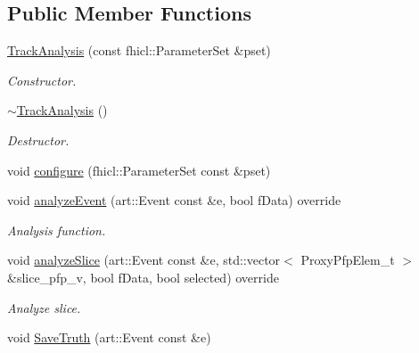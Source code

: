 \subsection*{Public Member Functions}
\begin{DoxyCompactItemize}
\item 
\hyperlink{classanalysis_1_1TrackAnalysis_aed13157ba9297149fe4e15676e6db7fc}{Track\+Analysis} (const fhicl\+::\+Parameter\+Set \&pset)
\begin{DoxyCompactList}\small\item\em Constructor. \end{DoxyCompactList}\item 
\hyperlink{classanalysis_1_1TrackAnalysis_a6f96bc87ab6d9dffb6417d7d2f1a89e2}{$\sim$\+Track\+Analysis} ()\hypertarget{classanalysis_1_1TrackAnalysis_a6f96bc87ab6d9dffb6417d7d2f1a89e2}{}\label{classanalysis_1_1TrackAnalysis_a6f96bc87ab6d9dffb6417d7d2f1a89e2}

\begin{DoxyCompactList}\small\item\em Destructor. \end{DoxyCompactList}\item 
void \hyperlink{classanalysis_1_1TrackAnalysis_a427d588370a8044b77560c92d3a35ea6}{configure} (fhicl\+::\+Parameter\+Set const \&pset)
\item 
void \hyperlink{classanalysis_1_1TrackAnalysis_aa5a295fc3fe8aa050905361f469ff108}{analyze\+Event} (art\+::\+Event const \&e, bool f\+Data) override
\begin{DoxyCompactList}\small\item\em Analysis function. \end{DoxyCompactList}\item 
void \hyperlink{classanalysis_1_1TrackAnalysis_a00e51059eed5a6486c9eb2f2f16017de}{analyze\+Slice} (art\+::\+Event const \&e, std\+::vector$<$ Proxy\+Pfp\+Elem\+\_\+t $>$ \&slice\+\_\+pfp\+\_\+v, bool f\+Data, bool selected) override\hypertarget{classanalysis_1_1TrackAnalysis_a00e51059eed5a6486c9eb2f2f16017de}{}\label{classanalysis_1_1TrackAnalysis_a00e51059eed5a6486c9eb2f2f16017de}

\begin{DoxyCompactList}\small\item\em Analyze slice. \end{DoxyCompactList}\item 
void \hyperlink{classanalysis_1_1TrackAnalysis_adde7746b5a45ec99cd67c0ab1fa19eb1}{Save\+Truth} (art\+::\+Event const \&e)\hypertarget{classanalysis_1_1TrackAnalysis_adde7746b5a45ec99cd67c0ab1fa19eb1}{}\label{classanalysis_1_1TrackAnalysis_adde7746b5a45ec99cd67c0ab1fa19eb1}


\end{DoxyCompactItemize}
